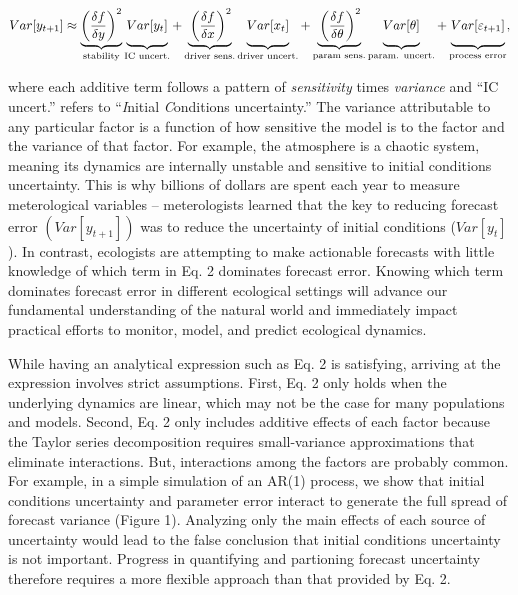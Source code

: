 \documentclass[12pt,]{article}
\begin{document}
\begin{align}
Var[y_{t+1}] \approx \underbrace{\left(\frac{\delta f}{\delta y} \right)^2}_{\text{stability}} 
               \underbrace{\vphantom{ \left(\frac{\delta f}{\delta y} \right)^2 } Var[y_t]}_{\text{IC uncert.}} +
               \underbrace{\vphantom{ \left(\frac{\delta f}{\delta y} \right)^2 }\left(\frac{\delta f}{\delta x} \right)^2}_{\text{driver sens.}} 
               \underbrace{\vphantom{ \left(\frac{\delta f}{\delta y} \right)^2 } Var[x_t]}_{\text{driver uncert.}} +
               \underbrace{\vphantom{ \left(\frac{\delta f}{\delta y} \right)^2 }\left(\frac{\delta f}{\delta \theta} \right)^2}_{\text{param sens.}}
               \underbrace{\vphantom{ \left(\frac{\delta f}{\delta y} \right)^2 } Var[\theta]}_{\text{param. uncert.}} +
               \underbrace{\vphantom{ \left(\frac{\delta f}{\delta y} \right)^2 } Var[\varepsilon_{t+1}]}_{\text{process error}},
\end{align}

\noindent{}where each additive term follows a pattern of
\emph{sensitivity} times \emph{variance} and ``IC uncert.'' refers to
``\emph{I}nitial \emph{C}onditions uncertainty.'' The variance
attributable to any particular factor is a function of how sensitive the
model is to the factor and the variance of that factor. For example, the
atmosphere is a chaotic system, meaning its dynamics are internally
unstable and sensitive to initial conditions uncertainty. This is why
billions of dollars are spent each year to measure meterological
variables -- meterologists learned that the key to reducing forecast
error \((Var[y_{t+1}])\) was to reduce the uncertainty of initial
conditions (\(Var[y_t]\)). In contrast, ecologists are attempting to
make actionable forecasts with little knowledge of which term in Eq. 2
dominates forecast error. Knowing which term dominates forecast error in
different ecological settings will advance our fundamental understanding
of the natural world and immediately impact practical efforts to
monitor, model, and predict ecological dynamics.

While having an analytical expression such as Eq. 2 is satisfying,
arriving at the expression involves strict assumptions. First, Eq. 2
only holds when the underlying dynamics are linear, which may not be the
case for many populations and models. Second, Eq. 2 only includes
additive effects of each factor because the Taylor series decomposition
requires small-variance approximations that eliminate interactions. But,
interactions among the factors are probably common. For example, in a
simple simulation of an AR(1) process, we show that initial conditions
uncertainty and parameter error interact to generate the full spread of
forecast variance (Figure 1). Analyzing only the main effects of each
source of uncertainty would lead to the false conclusion that initial
conditions uncertainty is not important. Progress in quantifying and
partioning forecast uncertainty therefore requires a more flexible
approach than that provided by Eq. 2.
\end{document}
